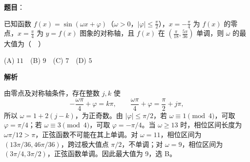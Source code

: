 \begin{answer}

\textbf{题目}：

已知函数 $f(x)=\sin(\omega x+\varphi)$（$\omega>0$，$|\varphi|\leq\frac\pi2$），$x=-\frac\pi4$ 为 $f(x)$ 的零点，$x=\frac\pi4$ 为 $y=f(x)$ 图象的对称轴，且 $f(x)$ 在 $(\frac\pi{18},\frac{5\pi}{36})$ 单调，则 $\omega$ 的最大值为（　）

   (A) $11$　(B) $9$　(C) $7$　(D) $5$

\textbf{解析}

由零点及对称轴条件，存在整数 \(j,k\) 使
\nopagebreak[4]
\[
-\frac{\omega\pi}{4}+\varphi=k\pi,\qquad
\frac{\omega\pi}{4}+\varphi=\frac\pi2+j\pi,
\]
所以 \(\omega=1+2(j-k)\)，为正奇数。由 \(|\varphi|\le\pi/2\)，若 \(\omega\equiv1\pmod4\)，可取 \(\varphi=\pi/4\)；若 \(\omega\equiv3\pmod4\)，可取 \(\varphi=-\pi/4\)。当 \(\omega\ge13\) 时，相位区间长度为 \(\omega\pi/12>\pi\)，正弦函数不可能在其上单调。对 \(\omega=11\)，相位区间为 \((13\pi/36,46\pi/36)\)，跨过极大值点 \(\pi/2\)，不单调；对 \(\omega=9\)，相位区间为 \((3\pi/4,3\pi/2)\)，正弦函数单调。因此最大值为 9，选 B。


\end{answer}

